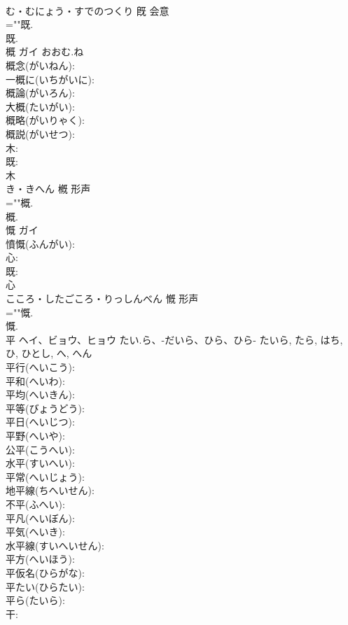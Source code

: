 \documentclass[8pt]{extreport}
\begin{document}
\begin{CJK}{UTF8}{min}
\\	む・むにょう・すでのつくり	既	会意 
\\	=""既.
\\	既.
\\	概	ガイ	おおむ.ね		
\\	概念(がいねん): 
\\	一概に(いちがいに): 
\\	概論(がいろん): 
\\	大概(たいがい): 
\\	概略(がいりゃく): 
\\	概説(がいせつ): 
\\	木: 
\\	既: 
\\	木	
\\	き・きへん	槪	形声 
\\	=""概.
\\	概.
\\	慨	ガイ			
\\	憤慨(ふんがい): 
\\	心: 
\\	既: 
\\	心	
\\	こころ・したごころ・りっしんべん	慨	形声 
\\	=""慨.
\\	慨.
\\	平	ヘイ、ビョウ、ヒョウ	たい.ら、-だいら、ひら、ひら-	たいら, たら, はち, ひ, ひとし, へ, へん	
\\	平行(へいこう): 
\\	平和(へいわ): 
\\	平均(へいきん): 
\\	平等(びょうどう): 
\\	平日(へいじつ): 
\\	平野(へいや): 
\\	公平(こうへい): 
\\	水平(すいへい): 
\\	平常(へいじょう): 
\\	地平線(ちへいせん): 
\\	不平(ふへい): 
\\	平凡(へいぼん): 
\\	平気(へいき): 
\\	水平線(すいへいせん): 
\\	平方(へいほう): 
\\	平仮名(ひらがな): 
\\	平たい(ひらたい): 
\\	平ら(たいら): 
\\	干: 

\end{CJK}
\end{document}
